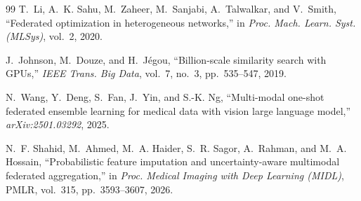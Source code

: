 \documentclass[letterpaper, conference]{IEEEtran}
\begin{document}
\begin{thebibliography}{99}
T.~Li, A.~K. Sahu, M.~Zaheer, M.~Sanjabi, A.~Talwalkar, and V.~Smith,
``Federated optimization in heterogeneous networks,'' in \emph{Proc. Mach.
Learn. Syst. (MLSys)}, vol.~2, 2020.

J.~Johnson, M.~Douze, and H.~J\'egou, ``Billion-scale similarity search with
GPUs,'' \emph{IEEE Trans. Big Data}, vol.~7, no.~3, pp.~535--547, 2019.

N.~Wang, Y.~Deng, S.~Fan, J.~Yin, and S.-K. Ng, ``Multi-modal one-shot
federated ensemble learning for medical data with vision large language
model,'' \emph{arXiv:2501.03292}, 2025.

N.~F. Shahid, M.~Ahmed, M.~A. Haider, S.~R. Sagor, A.~Rahman, and M.~A.
Hossain, ``Probabilistic feature imputation and uncertainty-aware multimodal
federated aggregation,'' in \emph{Proc. Medical Imaging with Deep Learning
(MIDL)}, PMLR, vol.~315, pp.~3593--3607, 2026.

\end{thebibliography}
\end{document}

